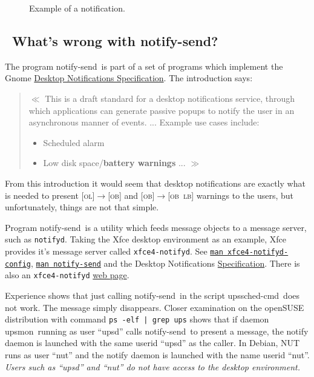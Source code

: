 \documentclass[12pt]{article}
\newlength{\headersep}\setlength{\headersep}{3mm}
\newcommand{\Hsep}{\hspace{\headersep}}
\newcommand{\upsmon}{\mbox{\textcolor{MONCOLOUR}{upsmon}}}
\newcommand{\upsschedcmd}{\mbox{\textcolor{CMDCOLOUR}{upssched-cmd}}}
\newcommand{\notifysend}{\mbox{\textcolor{NOTIFYCOLOUR}{notify-send}}}
\newcommand{\LB}{\textcolor{UPSDCOLOUR}{\textsc{lb}}}
\newcommand{\OB}{\textcolor{UPSDCOLOUR}{\textsc{ob}}}
\newcommand{\OL}{\textcolor{UPSDCOLOUR}{\textsc{ol}}}
\newcommand{\status}[1]{\textcolor{UPSDCOLOUR}{[{#1}]}}
\newcommand{\statuschange}[2]{\status{#1}{\allowbreak}\textcolor{UPSDCOLOUR}{$\rightarrow$}{\allowbreak}\status{#2}}
\newcommand{\DEBman}[1]{\href{https://manpages.debian.org/testing/#1}{\texttt{man #1}}}
\newcommand{\ul}{\begin{itemize}%
   \setlength{\itemsep}{0em}}
\newcommand{\eul}{\end{itemize}}
\newcommand{\li}{\item}                 %
\begin{document}
\begin{figure}[ht]
\begin{center}
\end{center}
\vspace{-6mm}
\caption{Example of a notification.\label{fig:notification}}
\end{figure}

\subsection{\Hsep\ What's wrong with \notifysend?}\label{section:notifysend.intro}

The program \notifysend\ is part of a set of programs which implement
the Gnome
\href{https://specifications.freedesktop.org/notification-spec/latest/}{Desktop
  Notifications Specification}.  The introduction says:

\begin{quotation}
$\ll$ This is a draft standard for a desktop notifications service, through
  which applications can generate passive popups to notify the user in an
  asynchronous manner of events. ...  Example use cases include:

\ul
\li Scheduled alarm
\li Low disk space/\textbf{battery warnings} ... $\gg$
\eul
\end{quotation}

From this introduction it would seem that desktop notifications are exactly
what is needed to present \statuschange{\OL}{\OB} and
\statuschange{\OB}{\OB\ \LB} warnings to the users, but unfortunately, things
are not that simple.

Program \notifysend\ is a utility which feeds message objects to a
message server, such as \texttt{notifyd}.  Taking the Xfce desktop
environment as an example, Xfce provides it's message server called
\texttt{xfce4-notifyd}.  See \DEBman{xfce4-notifyd-config},
\DEBman{notify-send} and the Desktop Notifications
\href{https://specifications.freedesktop.org/notification-spec/latest/}{Specification}.
There is also an \texttt{xfce4-notifyd}
\href{https://docs.xfce.org/apps/notifyd/start}{web page}.

Experience shows that just calling \notifysend\ in the script
\upsschedcmd\ does not work.  The message simply disappears.  Closer
examination on the openSUSE distribution with command \texttt{ps -elf
  | grep ups} shows that if daemon \upsmon\ running as user ``upsd''
calls \notifysend\ to present a message, the notify daemon is launched
with the same userid ``upsd'' as the caller.  In Debian, NUT runs as
user ``nut'' and the notify daemon is launched with the name userid
``nut''.  \textit{Users such as ``upsd'' and ``nut'' do not have
  access to the desktop environment.}
 
\end{document}
